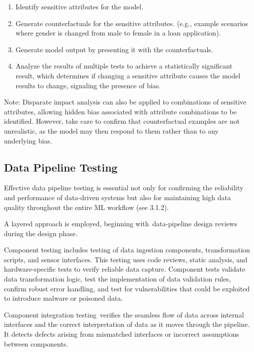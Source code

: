 \documentclass[
  letterpaper,
  DIV=11,
  numbers=noendperiod,
  oneside]{scrreprt}
\begin{document}
\begin{tcolorbox}
\begin{itemize}
  \begin{enumerate}
  \def\labelenumi{\arabic{enumi}.}
  \item
    Identify sensitive attributes for the model.
  \item
    Generate counterfactuals for the sensitive attributes. (e.g.,
    example scenarios where gender is changed from male to female in a
    loan application).
  \item
    Generate model output by presenting it with the counterfactuals.
  \item
    Analyze the results of multiple tests to achieve a statistically
    significant result, which determines if changing a sensitive
    attribute causes the model results to change, signaling the presence
    of bias.
  \end{enumerate}
\end{itemize}

Note: Disparate impact analysis can also be applied to combinations of
sensitive attributes, allowing hidden bias associated with attribute
combinations to be identified. However, take care to confirm that
counterfactual examples are not unrealistic, as the model may then
respond to them rather than to any underlying bias.

\subsection{Data Pipeline Testing}\label{data-pipeline-testing}

Effective data pipeline testing{} is essential not only for confirming
the reliability and performance of data-driven systems but also for
maintaining high data quality throughout the entire ML workflow (see
3.1.2).

A layered approach is employed, beginning with~data-pipeline design
reviews during the design phase.

Component testing includes testing of data ingestion components,
transformation scripts, and sensor interfaces. This testing uses code
reviews, static analysis, and hardware-specific tests to verify reliable
data capture. Component tests validate data transformation logic, test
the implementation of data validation rules, confirm robust error
handling, and test for vulnerabilities that could be exploited to
introduce malware or poisoned data.

Component integration testing~verifies the seamless flow of data across
internal interfaces and the correct interpretation of data as it moves
through the pipeline. It detects defects arising from mismatched
interfaces or incorrect assumptions between components.~


\end{tcolorbox}
\end{document}
